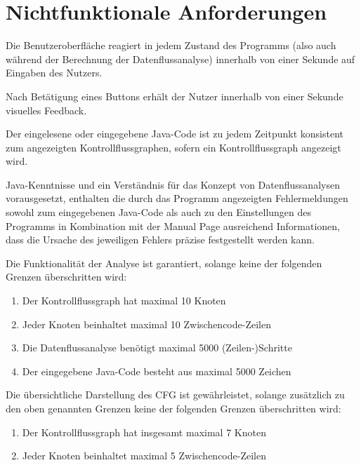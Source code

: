 
\section{Nichtfunktionale Anforderungen}


Die Benutzeroberfläche reagiert in jedem Zustand des Programms (also auch während der Berechnung der Datenflussanalyse) innerhalb von einer Sekunde auf Eingaben des Nutzers.


Nach Betätigung eines Buttons erhält der Nutzer innerhalb von einer Sekunde visuelles Feedback.


Der eingelesene oder eingegebene Java-Code ist zu jedem Zeitpunkt konsistent zum angezeigten Kontrollflussgraphen, sofern ein Kontrollflussgraph angezeigt wird.


Java-Kenntnisse und ein Verständnis für das Konzept von Datenflussanalysen vorausgesetzt, enthalten die durch das Programm angezeigten Fehlermeldungen sowohl zum eingegebenen Java-Code als auch zu den Einstellungen des Programms in Kombination mit der Manual Page ausreichend Informationen, dass die Ursache des jeweiligen Fehlers präzise festgestellt werden kann.


Die Funktionalität der Analyse ist garantiert, solange keine der folgenden Grenzen überschritten wird:
\begin{enumerate}[label=(\alph*)]
\item Der Kontrollflussgraph hat maximal 10 Knoten
\item Jeder Knoten beinhaltet maximal 10 Zwischencode-Zeilen
\item Die Datenflussanalyse benötigt maximal 5000 (Zeilen-)Schritte
\item Der eingegebene Java-Code besteht aus maximal 5000 Zeichen
\end{enumerate}

Die übersichtliche Darstellung des CFG ist gewährleistet, solange zusätzlich zu den oben genannten Grenzen keine der folgenden Grenzen überschritten wird:
\begin{enumerate}[label=(\alph*)]
\item Der Kontrollflussgraph hat insgesamt maximal 7 Knoten
\item Jeder Knoten beinhaltet maximal 5 Zwischencode-Zeilen
\end{enumerate}


